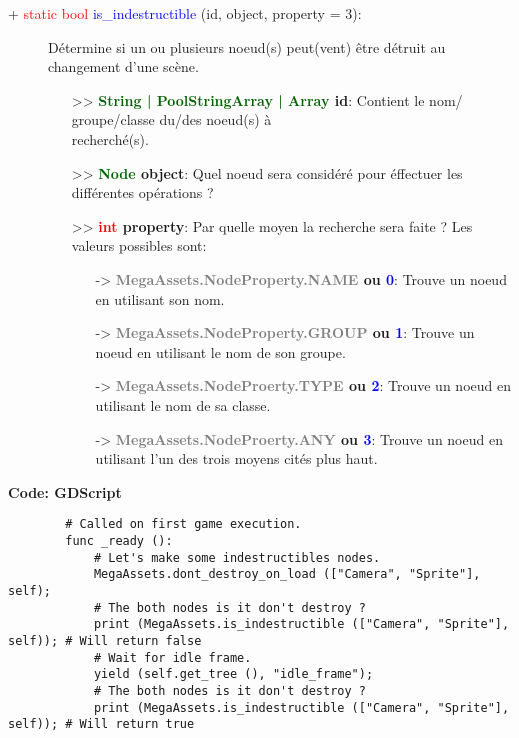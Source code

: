 \documentclass[a4paper, 11pt]{article}
\begin{document}
	\newpage \begin{description}
		\item [+ \textcolor{red}{static bool} \textcolor{blue}{is\_indestructible} (id, object, property = 
		3):] Détermine si un ou plusieurs noeud(s) peut(vent) être détruit au changement d'une scène.
		\begin{itemize}
			\item [>> \textbf{\textcolor{darkgreen}{String | PoolStringArray | Array} id}:] Contient le nom/
			groupe/classe du/des noeud(s) à \\recherché(s).
			\item [>> \textbf{\textcolor{darkgreen}{Node} object}:] Quel noeud sera considéré pour éffectuer
			les différentes opérations ?
			\item [>> \textbf{\textcolor{red}{int} property}:] Par quelle moyen la recherche sera faite ?
			Les valeurs possibles sont:
			\begin{itemize}
				\item [-> \textbf{\textcolor{gray}{MegaAssets.NodeProperty.NAME} ou \textcolor{blue}{0}}:] 
				Trouve un noeud en utilisant son nom.
				\item [-> \textbf{\textcolor{gray}{MegaAssets.NodeProperty.GROUP} ou \textcolor{blue}{1}}:] 
				Trouve un noeud en utilisant le nom de son groupe.
				\item [-> \textbf{\textcolor{gray}{MegaAssets.NodeProerty.TYPE} ou \textcolor{blue}{2}}:] 
				Trouve un noeud en utilisant le nom de sa classe.
				\item [-> \textbf{\textcolor{gray}{MegaAssets.NodeProerty.ANY} ou \textcolor{blue}{3}}:] 
				Trouve un noeud en utilisant l'un des trois moyens cités plus haut.\\
			\end{itemize}
		\end{itemize}
	\end{description}
	\textbf{Code: GDScript}
	\begin{lstlisting}
		# Called on first game execution.
		func _ready ():
			# Let's make some indestructibles nodes.
			MegaAssets.dont_destroy_on_load (["Camera", "Sprite"], self);
			# The both nodes is it don't destroy ?
			print (MegaAssets.is_indestructible (["Camera", "Sprite"], self)); # Will return false
			# Wait for idle frame.
			yield (self.get_tree (), "idle_frame");
			# The both nodes is it don't destroy ?
			print (MegaAssets.is_indestructible (["Camera", "Sprite"], self)); # Will return true
	\end{lstlisting}
\end{document}
